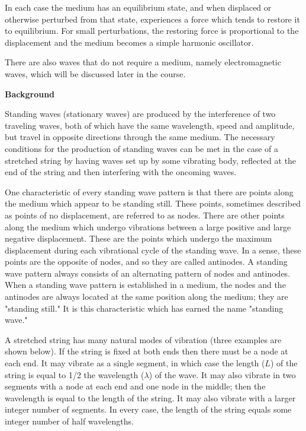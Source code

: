 In each case the medium has an equilibrium state, and when displaced or otherwise perturbed from that state, experiences a force which tends to
restore it to equilibrium. For small perturbations, the restoring force is proportional to the displacement and the medium becomes a simple harmonic
oscillator.

There are also waves that do not require a medium, namely electromagnetic waves, which will be discussed later in the course.

\textbf{Background}

Standing waves (stationary waves) are produced by the interference of two traveling waves, both of which have the
same wavelength, speed and amplitude, but travel in opposite directions through the same medium. The necessary conditions for the production of
standing waves can be met in the case of a stretched string by having waves set up by some vibrating body, reflected at the end of the string and
then interfering with the oncoming waves.

One characteristic of every standing wave pattern is that there are points along the medium which appear to be standing still. These points,
sometimes described as points of no displacement, are referred to as nodes. There are other points along the medium which undergo vibrations between
a large positive and large negative displacement. These are the points which undergo the maximum displacement during each vibrational cycle of the
standing wave. In a sense, these points are the opposite of nodes, and so they are called antinodes. A standing wave pattern always consists of an
alternating pattern of nodes and antinodes. When a standing wave pattern is established in a medium, the nodes and the antinodes are always located
at the same position along the medium; they are "standing still." It is this characteristic which has earned the name "standing wave."

A stretched string has many natural modes of vibration (three examples are shown below). If the string is fixed at both ends then there must be a
node at each end. It may vibrate as a single segment, in which case the length ($L$) of the string is equal to 1/2 the wavelength ($\lambda $) of
the wave. It may also vibrate in two segments with a node at each end and one node in the middle; then the wavelength is equal to the length of the
string. It may also vibrate with a larger integer number of segments. In every case, the length of the string equals some integer number of half
wavelengths.

